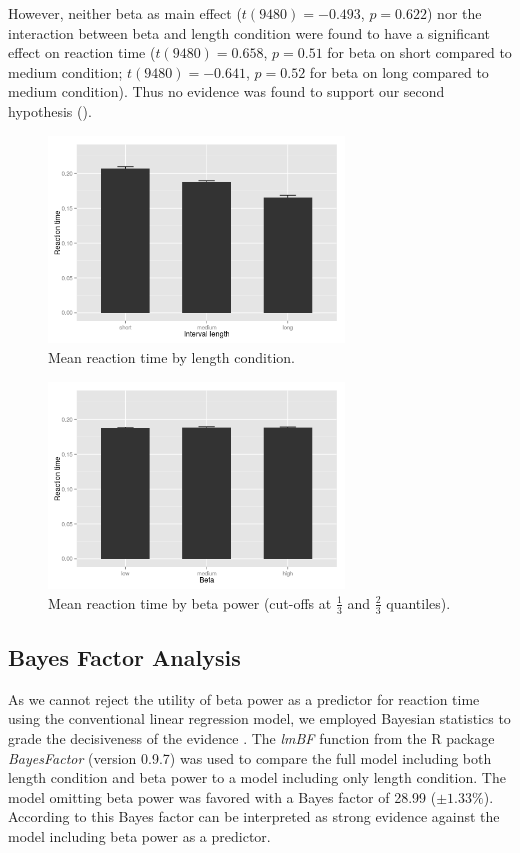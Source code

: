 \documentclass[man,floatsintext]{apa6} %
\begin{document}
However, neither beta as main effect ($t(9480) = -0.493$, $p = 0.622$)
nor the interaction between beta and length condition were found to
have a significant effect on reaction time ($t(9480) = 0.658$, $p =
0.51$ for beta on short compared to medium condition; $t(9480) =
-0.641$, $p = 0.52$ for beta on long compared to medium
condition). Thus no evidence was found to support our second hypothesis
().

\begin{figure}[!h]
  \includegraphics[width=0.7\textwidth]{actual_rt_by_length}
  \caption{Mean reaction time by length condition.}
  \label{fig:rt_by_length}
\end{figure}

\begin{figure}[!h]
  \includegraphics[width=0.7\textwidth]{actual_rt_by_beta}
  \caption{Mean reaction time by beta power (cut-offs at $\frac{1}{3}$ and $\frac{2}{3}$ quantiles).}
  \label{fig:rt_by_beta}
\end{figure}

\subsection{Bayes Factor Analysis}
As we cannot reject the utility of beta power as a predictor for
reaction time using the conventional linear regression model, we
employed Bayesian statistics to grade the decisiveness of the evidence
\cite{jeffreys_theory_1961}. The \emph{lmBF} function from the R
package \emph{BayesFactor} (version 0.9.7) was used to compare the
full model including both length condition and beta power to a model
including only length condition. The model omitting beta power was
favored with a Bayes factor of 28.99 ($\pm 1.33\%$). According to
 this Bayes factor can be interpreted as
strong evidence against the model including beta power as a predictor.
\end{document}
